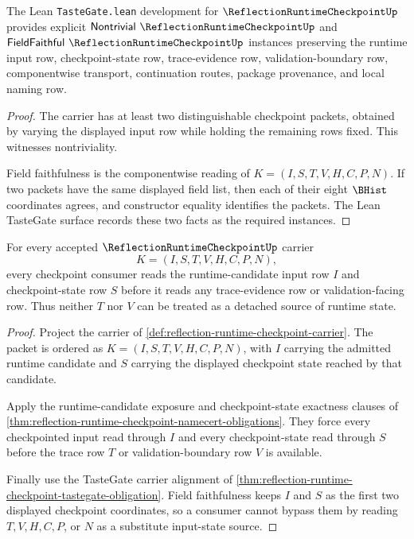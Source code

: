 
\begin{theorem}
\label{thm:reflection-runtime-checkpoint-tastegate-obligation}
The Lean \texttt{TasteGate.lean} development for $\ReflectionRuntimeCheckpointUp$ provides explicit $\mathsf{Nontrivial}\ \ReflectionRuntimeCheckpointUp$ and $\mathsf{FieldFaithful}\ \ReflectionRuntimeCheckpointUp$ instances preserving the runtime input row, checkpoint-state row, trace-evidence row, validation-boundary row, componentwise transport, continuation routes, package provenance, and local naming row.
\end{theorem}
\begin{proof}
The carrier has at least two distinguishable checkpoint packets, obtained by varying the displayed input row while holding the remaining rows fixed. This witnesses nontriviality.

Field faithfulness is the componentwise reading of $K=(I,S,T,V,H,C,P,N)$. If two packets have the same displayed field list, then each of their eight $\BHist$ coordinates agrees, and constructor equality identifies the packets. The Lean TasteGate surface records these two facts as the required instances.
\end{proof}

\begin{theorem}
\label{thm:reflection-runtime-checkpoint-input-state-exposure}
For every accepted $\ReflectionRuntimeCheckpointUp$ carrier
$$
K=(I,S,T,V,H,C,P,N),
$$
every checkpoint consumer reads the runtime-candidate input row $I$ and checkpoint-state row $S$ before it reads any trace-evidence row or validation-facing row. Thus neither $T$ nor $V$ can be treated as a detached source of runtime state.
\end{theorem}
\begin{proof}
Project the carrier of \autoref{def:reflection-runtime-checkpoint-carrier}. The packet is ordered as $K=(I,S,T,V,H,C,P,N)$, with $I$ carrying the admitted runtime candidate and $S$ carrying the displayed checkpoint state reached by that candidate.

Apply the runtime-candidate exposure and checkpoint-state exactness clauses of \autoref{thm:reflection-runtime-checkpoint-namecert-obligations}. They force every checkpointed input read through $I$ and every checkpoint-state read through $S$ before the trace row $T$ or validation-boundary row $V$ is available.

Finally use the TasteGate carrier alignment of \autoref{thm:reflection-runtime-checkpoint-tastegate-obligation}. Field faithfulness keeps $I$ and $S$ as the first two displayed checkpoint coordinates, so a consumer cannot bypass them by reading $T,V,H,C,P$, or $N$ as a substitute input-state source.
\end{proof}

